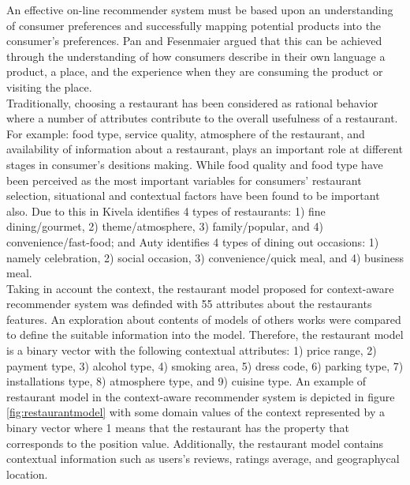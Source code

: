 An effective on-line recommender system must be based upon an
understanding of consumer  preferences and successfully mapping
potential products into the consumer’s
preferences\cite{adomavicius2011context}. Pan and
Fesenmaier\cite{pan2006online} argued that this can be achieved
through the understanding of how consumers describe in their own
language a product, a place, and the experience when they are
consuming the product or visiting the place.\\ Traditionally,
choosing a restaurant has been considered as rational behavior where a
number of attributes contribute to the overall usefulness of a
restaurant. For example: food type, service quality, atmosphere of the
restaurant, and availability of information about a restaurant, plays
an important role at different stages in consumer’s desitions
making\cite{auty1992consumer}. While food quality and food type have
been perceived as the most important variables for consumers’
restaurant selection, situational and contextual factors have been
found to be important also. Due to this in
Kivela\cite{jack1997restaurant} identifies 4 types of restaurants: 1)
fine dining/gourmet, 2) theme/atmosphere, 3) family/popular, and 4)
convenience/fast-food; and Auty\cite{auty1992consumer} identifies 4
types of dining out occasions: 1) namely celebration, 2) social
occasion, 3) convenience/quick meal, and 4) business meal.\\
Taking in account the context, the restaurant model proposed for
context-aware recommender system was definded with 55 attributes about the
restaurants features. An exploration about contents of models of
others works were compared to define the suitable information into the
model. Therefore, the restaurant model is a binary vector with the
following contextual attributes: 1) price range, 2) payment type, 3) alcohol
type, 4) smoking area, 5) dress code, 6) parking type, 7)
installations type, 8) atmosphere type, and 9) cuisine type. An
example of restaurant model in the context-aware recommender system is depicted in figure
\ref{fig:restaurantmodel} with some domain values of the context
represented by a binary vector where 1 means that the restaurant has
the property that corresponds to the position value. Additionally, the
restaurant model contains contextual information such as users's reviews, ratings average, and geographycal location.\\  
